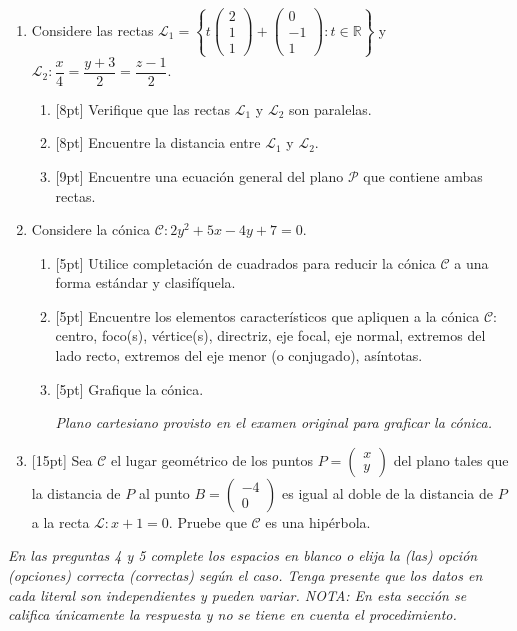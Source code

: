 \documentclass[11pt]{article}
\newcommand{\vect}[2]{\begin{pmatrix}#1\\#2\end{pmatrix}}
\newcommand{\vectiii}[3]{\begin{pmatrix}#1\\#2\\#3\end{pmatrix}}
\newcommand{\nota}[1]{{\small\itshape\color{unalblue!70!black} #1}}
\begin{document}
\begin{enumerate}
\item Considere las rectas $\mathcal{L}_1=\left\{t\vectiii{2}{1}{1}+\vectiii{0}{-1}{1}:t\in\mathbb{R}\right\}$ y $\mathcal{L}_2:\dfrac{x}{4}=\dfrac{y+3}{2}=\dfrac{z-1}{2}$.

\begin{enumerate}[label=(\alph*)]
\item{}[8pt] Verifique que las rectas $\mathcal{L}_1$ y $\mathcal{L}_2$ son paralelas.
\item{}[8pt] Encuentre la distancia entre $\mathcal{L}_1$ y $\mathcal{L}_2$.
\item{}[9pt] Encuentre una ecuación general del plano $\mathcal{P}$ que contiene ambas rectas.
\end{enumerate}

\item Considere la cónica $\mathcal{C}: 2y^2+5x-4y+7=0$.

\begin{enumerate}[label=(\alph*)]
\item{}[5pt] Utilice completación de cuadrados para reducir la cónica $\mathcal{C}$ a una forma estándar y clasifíquela.
\item{}[5pt] Encuentre los elementos característicos que apliquen a la cónica $\mathcal{C}$: centro, foco(s), vértice(s), directriz, eje focal, eje normal, extremos del lado recto, extremos del eje menor (o conjugado), asíntotas.
\item{}[5pt] Grafique la cónica.

\begin{center}
\end{center}
\nota{Plano cartesiano provisto en el examen original para graficar la cónica.}
\end{enumerate}

\item{}[15pt] Sea $\mathcal{C}$ el lugar geométrico de los puntos $P=\vect{x}{y}$ del plano tales que la distancia de $P$ al punto $B=\vect{-4}{0}$ es igual al doble de la distancia de $P$ a la recta $\mathcal{L}: x+1=0$. Pruebe que $\mathcal{C}$ es una hipérbola.
\end{enumerate}

\vspace{6pt}
\nota{En las preguntas 4 y 5 complete los espacios en blanco o elija la (las) opción (opciones) correcta (correctas) según el caso. Tenga presente que los datos en cada literal son independientes y pueden variar. NOTA: En esta sección se califica únicamente la respuesta y no se tiene en cuenta el procedimiento.}
\end{document}
